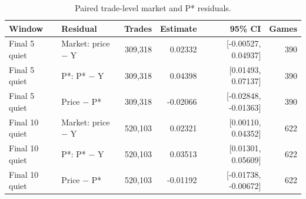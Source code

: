 \begin{table}[!htbp]
\centering
\small
\caption{Paired trade-level market and P* residuals.}
\label{tab:paired-residuals}
\begin{tabular}{llrrrr}
\toprule
Window & Residual & Trades & Estimate & 95\% CI & Games \\
\midrule
Final 5 quiet & Market: price − Y & 309,318 & 0.02332 & [-0.00527, 0.04937] & 390 \\
Final 5 quiet & P*: P* − Y & 309,318 & 0.04398 & [0.01493, 0.07137] & 390 \\
Final 5 quiet & Price − P* & 309,318 & -0.02066 & [-0.02848, -0.01363] & 390 \\
Final 10 quiet & Market: price − Y & 520,103 & 0.02321 & [0.00110, 0.04352] & 622 \\
Final 10 quiet & P*: P* − Y & 520,103 & 0.03513 & [0.01301, 0.05609] & 622 \\
Final 10 quiet & Price − P* & 520,103 & -0.01192 & [-0.01738, -0.00672] & 622 \\
\bottomrule
\end{tabular}
\end{table}
